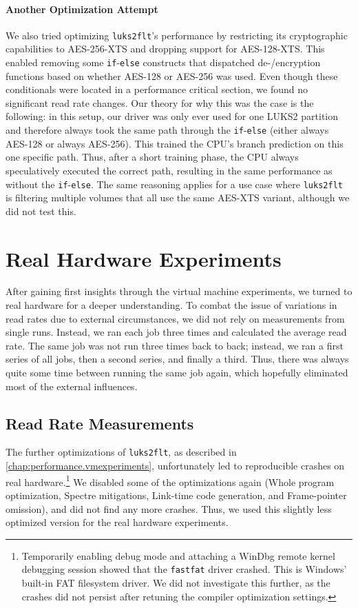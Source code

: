 \paragraph{Another Optimization Attempt}
We also tried optimizing \texttt{luks2flt}'s performance by restricting its cryptographic capabilities to AES-256-XTS and dropping support for AES-128-XTS. This enabled removing some \texttt{if}-\texttt{else} constructs that dispatched de-/encryption functions based on whether AES-128 or AES-256 was used. Even though these conditionals were located in a performance critical section, we found no significant read rate changes. Our theory for why this was the case is the following: in this setup, our driver was only ever used for one LUKS2 partition and therefore always took the same path through the \texttt{if}-\texttt{else} (either always AES-128 or always AES-256). This trained the CPU's branch prediction on this one specific path. Thus, after a short training phase, the CPU always speculatively executed the correct path, resulting in the same performance as without the \texttt{if}-\texttt{else}. The same reasoning applies for a use case where \texttt{luks2flt} is filtering multiple volumes that all use the same AES-XTS variant, although we did not test this.

\section{Real Hardware Experiments}
\label{chap:performance.hwexperiments}
After gaining first insights through the virtual machine experiments, we turned to real hardware for a deeper understanding. To combat the issue of variations in read rates due to external circumstances, we did not rely on measurements from single runs. Instead, we ran each job three times and calculated the average read rate. The same job was not run three times back to back; instead, we ran a first series of all jobs, then a second series, and finally a third. Thus, there was always quite some time between running the same job again, which hopefully eliminated most of the external influences.

\subsection{Read Rate Measurements}
\label{chap:performance.hwexperiments.encryptedseries2}
The further optimizations of \texttt{luks2flt}, as described in \autoref{chap:performance.vmexperiments}, unfortunately led to reproducible crashes on real hardware.\footnote{\label{fn:performance.hwexperiments.fastfatcrash} Temporarily enabling debug mode and attaching a WinDbg remote kernel debugging session showed that the \texttt{fastfat} driver crashed. This is Windows' built-in FAT filesystem driver. We did not investigate this further, as the crashes did not persist after retuning the compiler optimization settings.} We disabled some of the optimizations again (Whole program optimization, Spectre mitigations, Link-time code generation, and Frame-pointer omission), and did not find any more crashes. Thus, we used this slightly less optimized version for the real hardware experiments.

